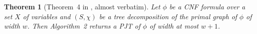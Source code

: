 \documentclass{article}
\newtheorem{theorem}{Theorem}
\newtheorem{lemma}{Lemma}
\theoremstyle{definition}
\theoremstyle{remark}
\begin{document}
\begin{theorem}[Theorem~4 in \cite{DBLP:conf/cp/DudekPV20}, almost verbatim]
  Let $\phi$ be a CNF formula over a set $X$ of variables and $(S, \chi)$ be a
  tree decomposition of the primal graph of $\phi$ of width $w$. Then
  Algorithm~2 returns a PJT of $\phi$ of width at most $w+1$.
\end{theorem}

\end{document}

